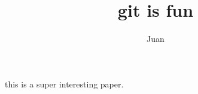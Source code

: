\documentclass[10pt]{article}
\author{Juan}
\title{git is fun}
\begin{document}
	\maketittle
	
	this is a super interesting paper.
\end{document}
